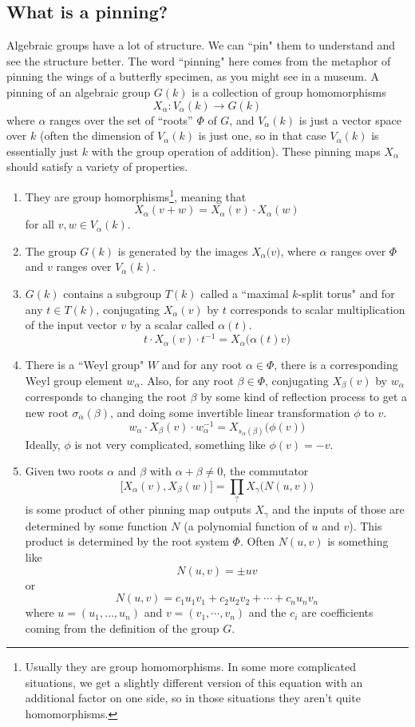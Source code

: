 \documentclass[12pt]{article}
\theoremstyle{definition}
\numberwithin{theorem}{subsection}
\newcommand{\sig}{\sigma}
\newcommand{\inv}{^{-1}}
\begin{document}
\subsection{What is a pinning?}


Algebraic groups have a lot of structure. We can ``pin" them to understand and see the structure better. The word ``pinning" here comes from the metaphor of pinning the wings of a butterfly specimen, as you might see in a museum. A pinning of an algebraic group $G(k)$ is a collection of group homomorphisms
\[
	X_\alpha:V_\alpha(k) \to G(k)
\]
where $\alpha$ ranges over the set of ``roots'' $\Phi$ of $G$, and $V_\alpha(k)$ is just a vector space over $k$ (often the dimension of $V_\alpha(k)$ is just one, so in that case $V_\alpha(k)$ is essentially just $k$ with the group operation of addition). These pinning maps $X_\alpha$ should satisfy a variety of properties.
\begin{enumerate}[(P1)]
	\item They are group homorphisms\footnote{Usually they are group homomorphisms. In some more complicated situations, we get a slightly different version of this equation with an additional factor on one side, so in those situations they aren't quite homomorphisms.}, meaning that
	\[
		X_\alpha(v+w) = X_\alpha(v) \cdot X_\alpha(w)
	\]
	for all $v,w \in V_\alpha(k)$.
	\item The group $G(k)$ is generated by the images $X_\alpha \big( v \big)$, where $\alpha$ ranges over $\Phi$ and $v$ ranges over $V_\alpha(k)$.
	\item $G(k)$ contains a subgroup $T(k)$ called a ``maximal $k$-split torus" and for any $t \in T(k)$, conjugating $X_\alpha(v)$ by $t$ corresponds to scalar multiplication of the input vector $v$ by a scalar called $\alpha(t)$.
	\[
		t \cdot X_\alpha(v) \cdot t \inv = X_\alpha \Big( \alpha(t) v \Big)
	\]
	\item There is a ``Weyl group" $W$ and for any root $\alpha \in \Phi$, there is a corresponding Weyl group element $w_\alpha$. Also, for any root $\beta \in \Phi$, conjugating $X_\beta(v)$ by $w_\alpha$ corresponds to changing the root $\beta$ by some kind of reflection process to get a new root $\sig_\alpha(\beta)$, and doing some invertible linear transformation $\phi$ to $v$.
	\[
		w_\alpha \cdot X_\beta(v) \cdot w_\alpha \inv = X_{s_\alpha(\beta)} \Big( \phi(v) \Big)
	\]
	Ideally, $\phi$ is not very complicated, something like $\phi(v) = -v$.
	\item Given two roots $\alpha$ and $\beta$ with $\alpha+\beta \neq 0$, the commutator
	\[
		\Big[ X_\alpha(v), X_\beta(w) \Big] = \prod_{?} X_\gamma\Big( N(u,v) \Big)
	\]
	is some product of other pinning map outputs $X_{\gamma}$ and the inputs of those are determined by some function $N$ (a polynomial function of $u$ and $v$). This product is determined by the root system $\Phi$. Often $N(u,v)$ is something like
\[
	N(u,v) = \pm uv
\]
or
\[
	N(u,v) = c_1 u_1 v_1 + c_2 u_2 v_2 + \cdots + c_n u_n v_n
\]
where $u = (u_1, \ldots, u_n)$ and $v = (v_1, \cdots, v_n)$ and the $c_i$ are coefficients coming from the definition of the group $G$.
\end{enumerate}
\end{document}
